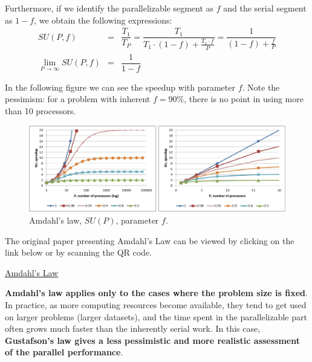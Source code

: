 \noindent
Furthermore, if we identify the parallelizable segment as $f$ and the serial segment as $1-f$, we obtain the following expressions:
\begin{equation}
    \begin{array}{rcl}
        SU\left(P,f\right) &=& \dfrac{T_{1}}{T_{P}} = \dfrac{T_{1}}{T_{1} \cdot \left(1-f\right) + \frac{T_{1}\cdot f}{P}} = \dfrac{1}{\left(1-f\right) + \frac{f}{P}} \\ [1em]
        \lim\limits_{P \rightarrow \infty}SU\left(P,f\right) &=& \dfrac{1}{1-f}
    \end{array}
\end{equation}

\highspace
In the following figure we can see the speedup with parameter $f$. Note the pessimism: for a problem with inherent $f=90\%$, there is no point in using more than 10 processors.
\begin{figure}[!htp]
    \centering
    \includegraphics[width=\textwidth]{img/amdahl-law-2.pdf}
    \caption{Amdahl's law, $SU\left(P\right)$, parameter $f$.}
\end{figure}

\noindent
The original paper presenting Amdahl's Law\cite{amdahl2007validity} can be viewed by clicking on the link below or by scanning the QR code.
\begin{center}
    \href{https://ieeexplore.ieee.org/abstract/document/4785615}{Amdahl's Law}
    \hspace{2em}
\end{center}
\textbf{Amdahl's law applies only to the cases where the problem size is fixed}. In practice, as more computing resources become available, they tend to get used on larger problems (larger datasets), and the time spent in the parallelizable part often grows much faster than the inherently serial work. In this case, \textbf{Gustafson's law gives a less pessimistic and more realistic assessment of the parallel performance}.\cite{mccool2012structured}

